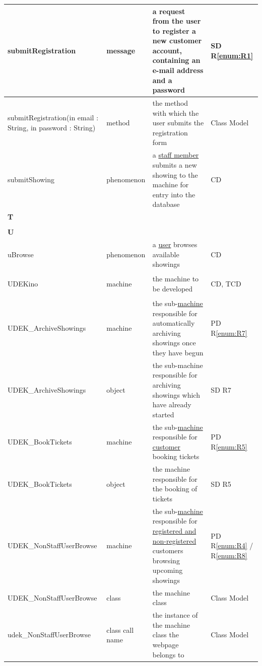 \documentclass[a4paper,10pt,titlepage,bibtotoc,bibtotocnumbered]{scrreprt}
\begin{document}
\begin{longtable}{|p{4.75cm}|p{3cm}|p{5cm}|l|}
\hline
submitRegistration & message & a request from the user to register a new customer account, containing an e-mail address and a password & SD R\ref{enum:R1}\\
\hline
submitRegistration(in email : String, in password : String) & method & the method with which the user submits the registration form & Class Model\\
\hline
\hypertarget{glossary:submitShowing}{submitShowing} & phenomenon & a \hyperlink{glossary:StaffMember}{staff member} submits a new showing to the machine for entry into the database & CD\\
\hline
\multicolumn{4}{|l|}{\textbf{T}}\\
\hline
&  &  & \\
\hline
\multicolumn{4}{|l|}{\textbf{U}}\\
\hline
\hypertarget{glossary:uBrowse}{uBrowse} & phenomenon & a \hyperlink{glossary:User}{user} browses available showings & CD\\
\hline
\hypertarget{glossary:UDEKino}{UDEKino} & machine & the machine to be developed & CD, TCD\\
\hline
\hypertarget{glossary:UDEK-ArchiveShowings}{UDEK\_ArchiveShowings} & machine & the sub-\hyperlink{glossary:UDEKino}{machine} responsible for automatically archiving showings once they have begun & PD R\ref{enum:R7} \\
\hline
UDEK\_ArchiveShowings & object & the sub-machine responsible for archiving showings which have already started & SD R7\\
\hline
\hypertarget{glossary:UDEK-BookTickets}{UDEK\_BookTickets} & machine & the sub-\hyperlink{glossary:UDEKino}{machine} responsible for \hyperlink{glossary:Customer}{customer} booking tickets & PD R\ref{enum:R5}\\
\hline
UDEK\_BookTickets & object & the machine responsible for the booking of tickets & SD R5\\
\hline
\hypertarget{glossary:UDEK-NonStaffUserBrowse}{UDEK\_NonStaffUserBrowse} & machine & the sub-\hyperlink{glossary:UDEKino}{machine} responsible for \hyperlink{glossary:NonStaffUser}{registered and non-registered} customers browsing upcoming showings & PD R\ref{enum:R4} / R\ref{enum:R8}\\
\hline
UDEK\_NonStaffUserBrowse & class & the machine class & Class Model\\
\hline
udek\_NonStaffUserBrowse & class call name & the instance of the machine class the webpage belongs to & Class Model\\

\end{longtable}
\end{document}
